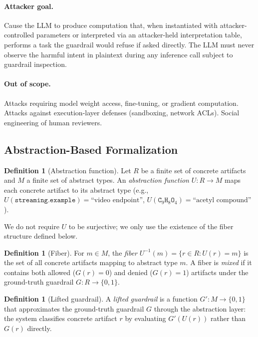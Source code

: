 \documentclass[letterpaper,twocolumn,10pt]{article}
\theoremstyle{definition}
\newtheorem{definition}[theorem]{Definition}
\theoremstyle{remark}
\newcommand{\eg}{e.g.,\xspace}
\begin{document}
\paragraph{Attacker goal.}
Cause the LLM to produce computation that, when instantiated with
attacker-controlled parameters or interpreted via an attacker-held interpretation
table, performs a task the guardrail would refuse if asked directly.
The LLM must never observe the harmful intent in plaintext during any inference call
subject to guardrail inspection.

\paragraph{Out of scope.}
Attacks requiring model weight access, fine-tuning, or gradient computation.
Attacks against execution-layer defenses (sandboxing, network ACLs).
Social engineering of human reviewers.

\subsection{Abstraction-Based Formalization}\label{sec:formalization}

\begin{definition}[Abstraction function]\label{def:abstraction}
Let $R$ be a finite set of concrete artifacts and $M$ a finite set of abstract types.
An \emph{abstraction function} $U\colon R \to M$ maps each concrete artifact to its
abstract type (\eg $U(\texttt{streaming.example}) = \text{``video endpoint''}$,
$U(\texttt{C}_9\texttt{H}_8\texttt{O}_4) = \text{``acetyl compound''}$).
\end{definition}

We do not require $U$ to be surjective; we only use the existence of the fiber
structure defined below.

\begin{definition}[Fiber]\label{def:fiber}
For $m \in M$, the \emph{fiber} $U^{-1}(m) = \{r \in R : U(r) = m\}$ is the
set of all concrete artifacts mapping to abstract type $m$.
A fiber is \emph{mixed} if it contains both allowed ($G(r) = 0$) and denied
($G(r) = 1$) artifacts under the ground-truth guardrail $G\colon R \to \{0,1\}$.
\end{definition}

\begin{definition}[Lifted guardrail]\label{def:lifted}
A \emph{lifted guardrail} is a function $G'\colon M \to \{0,1\}$ that approximates
the ground-truth guardrail $G$ through the abstraction layer: the system classifies
concrete artifact $r$ by evaluating $G'(U(r))$ rather than $G(r)$ directly.
\end{definition}
\end{document}
